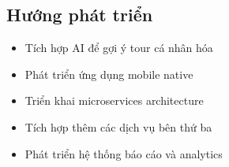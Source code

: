 \documentclass[12pt,a4paper]{article}
\begin{document}
\subsection{Hướng phát triển}
\begin{itemize}
    \item Tích hợp AI để gợi ý tour cá nhân hóa
    \item Phát triển ứng dụng mobile native
    \item Triển khai microservices architecture
    \item Tích hợp thêm các dịch vụ bên thứ ba
    \item Phát triển hệ thống báo cáo và analytics
\end{itemize}
\end{document}
